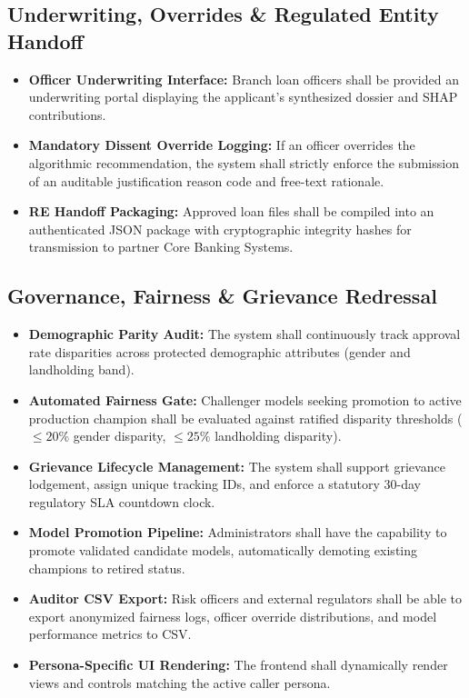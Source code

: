 \documentclass[11pt,a4paper,oneside]{report}
\begin{document}
\subsection{Underwriting, Overrides \& Regulated Entity Handoff}
\begin{itemize}[leftmargin=2em, label=\textbf{FR-\arabic*.}]
  \setcounter{enumi}{9}
  \item \textbf{Officer Underwriting Interface:} Branch loan officers shall be provided an underwriting portal displaying the applicant's synthesized dossier and SHAP contributions.
  \item \textbf{Mandatory Dissent Override Logging:} If an officer overrides the algorithmic recommendation, the system shall strictly enforce the submission of an auditable justification reason code and free-text rationale.
  \item \textbf{RE Handoff Packaging:} Approved loan files shall be compiled into an authenticated JSON package with cryptographic integrity hashes for transmission to partner Core Banking Systems.
\end{itemize}

\subsection{Governance, Fairness \& Grievance Redressal}
\begin{itemize}[leftmargin=2em, label=\textbf{FR-\arabic*.}]
  \setcounter{enumi}{12}
  \item \textbf{Demographic Parity Audit:} The system shall continuously track approval rate disparities across protected demographic attributes (gender and landholding band).
  \item \textbf{Automated Fairness Gate:} Challenger models seeking promotion to active production champion shall be evaluated against ratified disparity thresholds ($\le 20\%$ gender disparity, $\le 25\%$ landholding disparity).
  \item \textbf{Grievance Lifecycle Management:} The system shall support grievance lodgement, assign unique tracking IDs, and enforce a statutory 30-day regulatory SLA countdown clock.
  \item \textbf{Model Promotion Pipeline:} Administrators shall have the capability to promote validated candidate models, automatically demoting existing champions to retired status.
  \item \textbf{Auditor CSV Export:} Risk officers and external regulators shall be able to export anonymized fairness logs, officer override distributions, and model performance metrics to CSV.
  \item \textbf{Persona-Specific UI Rendering:} The frontend shall dynamically render views and controls matching the active caller persona.
\end{itemize}
\end{document}
